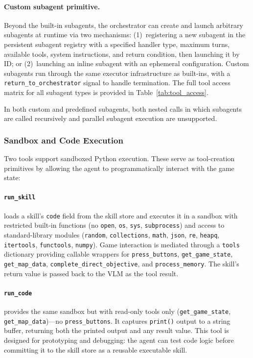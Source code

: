 \paragraph{Custom subagent primitive.} Beyond the built-in subagents, the orchestrator can create and launch arbitrary subagents at runtime via two mechanisms: (1)~registering a new subagent in the persistent subagent registry with a specified handler type, maximum turns, available tools, system instructions, and return condition, then launching it by ID; or (2)~launching an inline subagent with an ephemeral configuration. Custom subagents run through the same executor infrastructure as built-ins, with a \texttt{return\_to\_orchestrator} signal to handle termination. The full tool access matrix for all subagent types is provided in Table~\ref{tab:tool_access}.

In both custom and predefined subagents, both nested calls in which subagents are called recursively and parallel subagent execution are unsupported.


\subsubsection{Sandbox and Code Execution}\label{sec:sandbox}

Two tools support sandboxed Python execution. These serve as tool-creation primitives by allowing the agent to programmatically interact with the game state:

\paragraph{\texttt{run\_skill}} loads a skill's \texttt{code} field from the skill store and executes it in a sandbox with restricted built-in functions (no \texttt{open}, \texttt{os}, \texttt{sys}, \texttt{subprocess}) and access to standard-library modules (\texttt{random}, \texttt{collections}, \texttt{math}, \texttt{json}, \texttt{re}, \texttt{heapq}, \texttt{itertools}, \texttt{functools}, \texttt{numpy}). Game interaction is mediated through a \texttt{tools} dictionary providing callable wrappers for \texttt{press\_buttons}, \texttt{get\_game\_state}, \texttt{get\_map\_data}, \texttt{complete\_direct\_objective}, and \texttt{process\_memory}. The skill's return value is passed back to the VLM as the tool result.

\paragraph{\texttt{run\_code}} provides the same sandbox but with read-only tools only (\texttt{get\_game\_state}, \texttt{get\_map\_data})---no \texttt{press\_buttons}. It captures \texttt{print()} output to a string buffer, returning both the printed output and any result value. This tool is designed for prototyping and debugging: the agent can test code logic before committing it to the skill store as a reusable executable skill.

